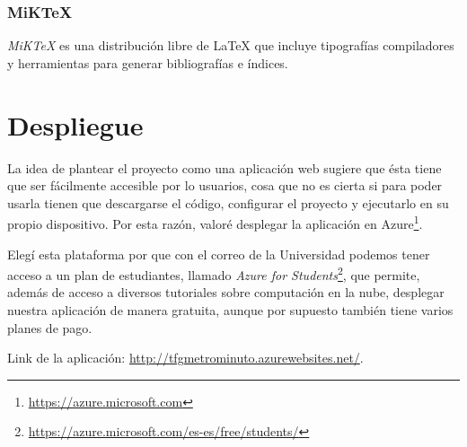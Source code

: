 \subsubsection{MiK\TeX}
\textit{MiK\TeX} es una distribución libre de \LaTeX{} que incluye tipografías compiladores y herramientas para generar bibliografías e índices.


\section{Despliegue}
La idea de plantear el proyecto como una aplicación web sugiere que ésta tiene que ser fácilmente accesible por lo usuarios, cosa que no es cierta si para poder usarla tienen que descargarse el código, configurar el proyecto y ejecutarlo en su propio dispositivo. Por esta razón, valoré desplegar la aplicación en Azure\footnote{\url{https://azure.microsoft.com}}.

Elegí esta plataforma por que con el correo de la Universidad podemos tener acceso a un plan de estudiantes, llamado \textit{Azure for Students}\footnote{\url{https://azure.microsoft.com/es-es/free/students/}}, que permite, además de acceso a diversos tutoriales sobre computación en la nube, desplegar nuestra aplicación de manera gratuita, aunque por supuesto también tiene varios planes de pago.


Link de la aplicación: \url{http://tfgmetrominuto.azurewebsites.net/}.